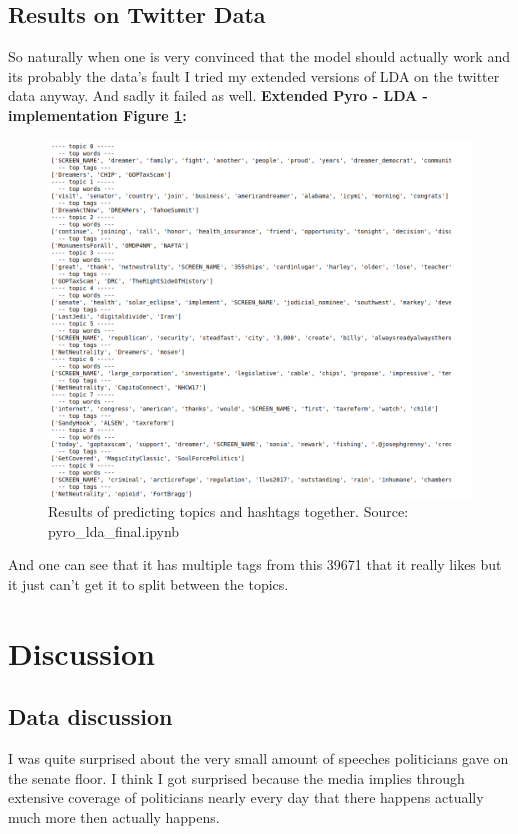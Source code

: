 \documentclass[10pt,conference,compsocconf]{IEEEtran}
\begin{document}
\subsection{Results on Twitter Data}
So naturally when one is very convinced that the model should actually work and its probably the data's fault I tried my extended versions of LDA on the twitter data anyway. And sadly it failed as well. 
\textbf{Extended Pyro - LDA - implementation Figure \ref{fig:resultldaontwitter}:}
\begin{figure}[h]
	\centering
	\includegraphics[width=0.7\linewidth]{images/result_lda_on_twitter}
	\caption{Results of predicting topics and hashtags together. Source: pyro\_lda\_final.ipynb}
	\label{fig:resultldaontwitter}
\end{figure}
And one can see that it has multiple tags from this 39671 that it really likes but it just can't get it to split between the topics. 



\section{Discussion}
\label{sec:Discussion}

\subsection{Data discussion}

I was quite surprised about the very small amount of speeches politicians gave on the senate floor. I think I got surprised because the media implies through extensive coverage of politicians nearly every day that there happens actually much more then actually happens. \\
\end{document}
